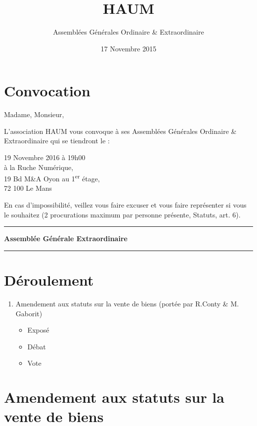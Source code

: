 \documentclass[11pt,twosided]{article}
\title{HAUM}
\author{Assemblées Générales Ordinaire \& Extraordinaire}
\date{17 Novembre 2015}
\begin{document}
\maketitle


\section*{Convocation}

Madame, Monsieur,

L'association HAUM vous convoque à ses Assemblées Générales Ordinaire \& Extraordinaire qui se tiendront le :

\begin{center}
{\Large 19 Novembre 2016 à 19h00}\\
à la Ruche Numérique,\\19 Bd M\&A Oyon au 1\textsuperscript{er} étage,\\72 100 Le Mans
\end{center}

En cas d'impossibilité, veillez vous faire excuser et vous faire représenter si vous le souhaitez (2 procurations maximum par personne présente, Statuts, art. 6).

\newpage

\vspace{1.5cm}

\hrule
\begin{center}
\Large\bfseries Assemblée Générale Extraordinaire
\end{center}
\hrule

\vspace{1.5cm}

\section*{Déroulement}

\begin{enumerate}
    \item Amendement aux statuts sur la vente de biens (portée par R.Conty \& M. Gaborit)
    \begin{itemize}
        \item Exposé
        \item Débat
        \item Vote
    \end{itemize}
\end{enumerate}


\section{Amendement aux statuts sur la vente de biens}
\end{document}
